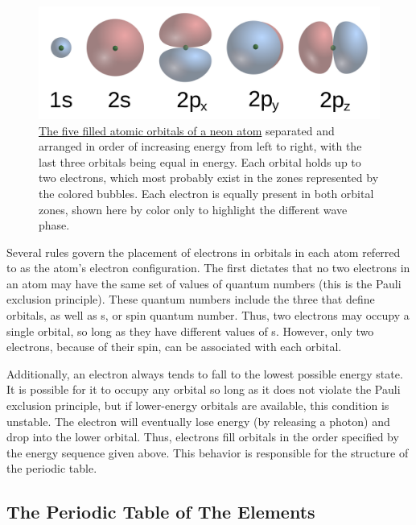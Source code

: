 \begin{figure}

{\centering \includegraphics[width=0.7\linewidth]{./figures/chemistry/S-p-Orbitals} 

}

\caption{\href{https://commons.wikimedia.org/wiki/File:S-p-Orbitals.svg}{The five filled atomic orbitals of a neon atom} separated and arranged in order of increasing energy from left to right, with the last three orbitals being equal in energy. Each orbital holds up to two electrons, which most probably exist in the zones represented by the colored bubbles. Each electron is equally present in both orbital zones, shown here by color only to highlight the different wave phase.}\label{fig:atomicorbitals}
\end{figure}

Several rules govern the placement of electrons in orbitals in each atom
referred to as the atom's electron configuration. The first dictates
that no two electrons in an atom may have the same set of values of
quantum numbers (this is the Pauli exclusion principle). These quantum
numbers include the three that define orbitals, as well as s, or spin
quantum number. Thus, two electrons may occupy a single orbital, so long
as they have different values of s. However, only two electrons, because
of their spin, can be associated with each orbital.

Additionally, an electron always tends to fall to the lowest possible
energy state. It is possible for it to occupy any orbital so long as it
does not violate the Pauli exclusion principle, but if lower-energy
orbitals are available, this condition is unstable. The electron will
eventually lose energy (by releasing a photon) and drop into the lower
orbital. Thus, electrons fill orbitals in the order specified by the
energy sequence given above. This behavior is responsible for the
structure of the periodic table.

\hypertarget{the-periodic-table-of-the-elements}{%
\subsection{The Periodic Table of The
Elements}\label{the-periodic-table-of-the-elements}}


